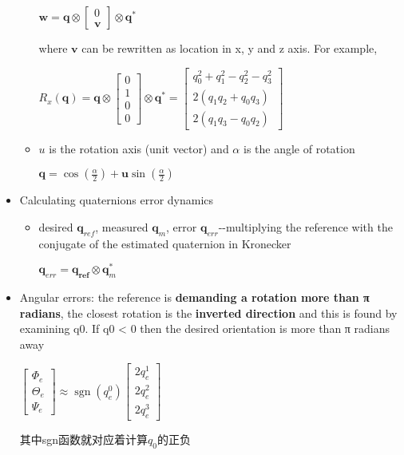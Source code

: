 \documentclass[]{article}
\begin{document}
\begin{itemize}
\begin{itemize}
    \(\boldsymbol{w}=\boldsymbol{q} \otimes\left[\begin{array}{l}0 \\ \mathbf{v}\end{array}\right] \otimes \boldsymbol{q}^{*}\)

    where \(\textbf{v}\) can be rewritten as location in x, y and z
    axis. For example,

    \(R_{x}(\boldsymbol{q})=\boldsymbol{q} \otimes\left[\begin{array}{l}0 \\ 1 \\ 0 \\ 0\end{array}\right] \otimes \boldsymbol{q}^{*}=\left[\begin{array}{c}q_{0}^{2}+q_{1}^{2}-q_{2}^{2}-q_{3}^{2} \\ 2\left(q_{1} q_{2}+q_{0} q_{3}\right) \\ 2\left(q_{1} q_{3}-q_{0} q_{2}\right)\end{array}\right]\)
  \item
    \(u\) is the rotation axis (unit vector) and \(\alpha\) is the angle
    of rotation

    \(\boldsymbol{q}=\cos \left(\frac{\alpha}{2}\right)+\boldsymbol{u} \sin \left(\frac{\alpha}{2}\right)\)
  \end{itemize}
\item
  Calculating quaternions error dynamics

  \begin{itemize}
  \item
    desired \(\mathbf{q}_{ref}\), measured \(\mathbf{q}_{m}\), error
    \(\mathbf{q}_{err}\)-\/-multiplying the reference with the conjugate
    of the estimated quaternion in Kronecker

    \(\boldsymbol{q}_{e r r}=\boldsymbol{q}_{\boldsymbol{r e f}} \otimes \boldsymbol{q}_{m}^{*}\)
  \end{itemize}
\item
  Angular errors: the reference is \textbf{demanding a rotation more
  than π radians}, the closest rotation is the \textbf{inverted
  direction} and this is found by examining q0. If q0 \textless{} 0 then
  the desired orientation is more than π radians away

  \(\left[\begin{array}{c}
  \Phi_{e} \\
  \Theta_{e} \\
  \Psi_{e}
  \end{array}\right] \approx \operatorname{sgn}\left(q_{e}^{0}\right)\left[\begin{array}{l}
  2 q_{e}^{1} \\
  2 q_{e}^{2} \\
  2 q_{e}^{3}
  \end{array}\right]\)

  其中sgn函数就对应着计算\(q_0\)的正负
\end{itemize}
\end{document}

